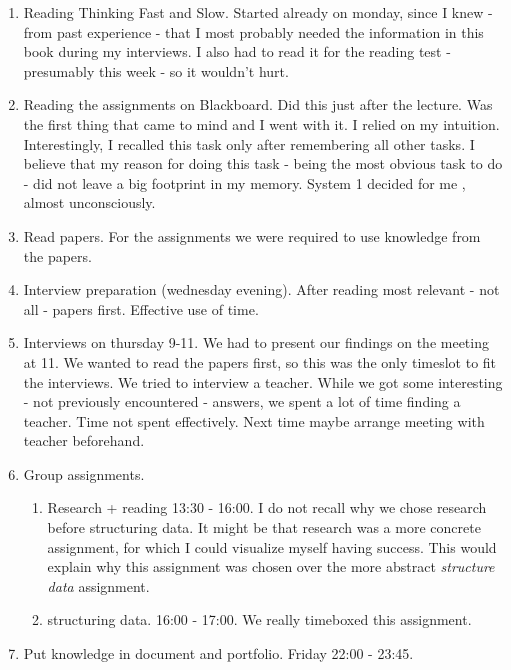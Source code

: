\begin{enumerate}
	\item Reading Thinking Fast and Slow. Started already on monday, since I knew - from past experience - that I most probably needed the information in this book during my interviews. I also had to read it for the reading test - presumably this week - so it wouldn't hurt.
	\item Reading the assignments on Blackboard. Did this just after the lecture. Was the first thing that came to mind and I went with it. I relied on my intuition. Interestingly, I recalled this task only after remembering all other tasks. I believe that my reason for doing this task - being the most obvious task to do - did not leave a big footprint in my memory. System 1 decided for me \cite{kahneman}, almost unconsciously. 
	\item Read papers. For the assignments we were required to use knowledge from the papers. 
	\item Interview preparation (wednesday evening). After reading most relevant - not all - papers first. Effective use of time.
	\item Interviews on thursday 9-11. We had to present our findings on the meeting at 11. We wanted to read the papers first, so this was the only timeslot to fit the interviews. We tried to interview a teacher. While we got some interesting - not previously encountered - answers, we spent a lot of time finding a teacher. Time not spent effectively. Next time maybe arrange meeting with teacher beforehand.
	\item Group assignments. \begin{enumerate}
		\item Research + reading 13:30 - 16:00. I do not recall why we chose research before structuring data. It might be that research was a more concrete assignment, for which I could visualize myself having success. This would explain why this assignment was chosen over the more abstract \emph{structure data} assignment.
		\item structuring data. 16:00 - 17:00. We really timeboxed this assignment. 
	\end{enumerate}
	\item Put knowledge in document and portfolio. Friday 22:00 - 23:45. 
\end{enumerate}

\clearpage
